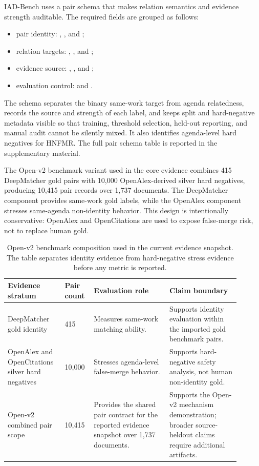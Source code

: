 \documentclass[11pt]{article}
\begin{document}
IAD-Bench uses a pair schema that makes relation semantics and evidence strength auditable. The required fields are grouped as follows:
\begin{itemize}
\setlength{\itemsep}{0pt}
\item pair identity: , , and ;
\item relation targets: , , and ;
\item evidence source: , , and ;
\item evaluation control:  and .
\end{itemize}
The schema separates the binary same-work target from agenda relatedness, records the source and strength of each label, and keeps split and hard-negative metadata visible so that training, threshold selection, held-out reporting, and manual audit cannot be silently mixed. It also identifies agenda-level hard negatives for HNFMR. The full pair schema table is reported in the supplementary material.

The Open-v2 benchmark variant used in the core evidence combines 415 DeepMatcher gold pairs with 10,000 OpenAlex-derived silver hard negatives, producing 10,415 pair records over 1,737 documents. The DeepMatcher component provides same-work gold labels, while the OpenAlex component stresses same-agenda non-identity behavior. This design is intentionally conservative: OpenAlex and OpenCitations are used to expose false-merge risk, not to replace human gold.

\begin{table}[H]
\caption{Open-v2 benchmark composition used in the current evidence snapshot. The table separates identity evidence from hard-negative stress evidence before any metric is reported.}
\label{tab:openv2-composition}
\centering
\footnotesize
\setlength{\tabcolsep}{3pt}
\begin{tabular}{L{0.22\linewidth}L{0.10\linewidth}L{0.30\linewidth}L{0.28\linewidth}}
\toprule
Evidence stratum & Pair count & Evaluation role & Claim boundary \\
\midrule
DeepMatcher gold identity & 415 & Measures same-work matching ability. & Supports identity evaluation within the imported gold benchmark pairs. \\
OpenAlex and OpenCitations silver hard negatives & 10,000 & Stresses agenda-level false-merge behavior. & Supports hard-negative safety analysis, not human non-identity gold. \\
Open-v2 combined pair scope & 10,415 & Provides the shared pair contract for the reported evidence snapshot over 1,737 documents. & Supports the Open-v2 mechanism demonstration; broader source-heldout claims require additional artifacts. \\
\bottomrule
\end{tabular}
\end{table}
\end{document}
